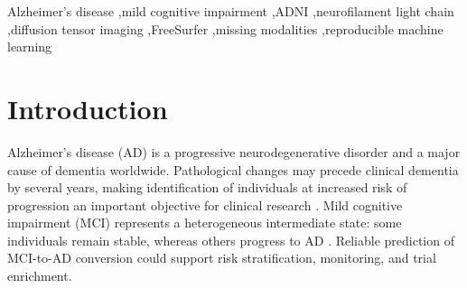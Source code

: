 \documentclass[preprint,12pt]{elsarticle}
\begin{document}
\begin{frontmatter}
\begin{abstract}
\textbf{Results:}
Clinical variables were nearly complete, whereas NfL and primary DTI features were available for 336 (47.9\%) and 127 (18.1\%) participants, respectively. In prespecified logistic-regression ablations, clinical core features achieved an AUC of 0.580 (95\% CI 0.486--0.674), clinical extended features plus NfL achieved 0.678 (0.590--0.762), and clinical extended features plus DTI achieved 0.636 (0.547--0.727). Exploratory structural MRI analysis achieved an AUC of 0.780 (0.703--0.848), while the exploratory all-modality configuration achieved 0.802 (0.730--0.872). Complete-case DTI evaluation was infeasible because the test subset contained only four converters.

\textbf{Conclusions:}
NfL provided a modest improvement over clinical characteristics, while sparse DTI availability limited reliable complete-case evaluation. Structural MRI findings were stronger but remain exploratory and require independent validation. Explicit cohort rules, temporal matching, training-only preprocessing, and uncertainty reporting were essential for distinguishing reproducible findings from results driven by limited or informative modality availability.

\end{abstract}

\begin{keyword}
Alzheimer's disease \sep mild cognitive impairment \sep ADNI \sep neurofilament light chain \sep diffusion tensor imaging \sep FreeSurfer \sep missing modalities \sep reproducible machine learning
\end{keyword}

\end{frontmatter}

\linenumbers

\section{Introduction}

Alzheimer's disease (AD) is a progressive neurodegenerative disorder and a major cause of dementia worldwide. Pathological changes may precede clinical dementia by several years, making identification of individuals at increased risk of progression an important objective for clinical research \cite{jackNIAAAResearchFramework2018,michaelw.weinerAlzheimersDiseaseNeuroimaging2017}. Mild cognitive impairment (MCI) represents a heterogeneous intermediate state: some individuals remain stable, whereas others progress to AD \cite{albertDiagnosisMildCognitive2011,petersenPracticeGuidelineUpdate2018,christosdavatzikosPredictionMCIAD2011,shannonl.risacherBaselineMRIPredictors2009}. Reliable prediction of MCI-to-AD conversion could support risk stratification, monitoring, and trial enrichment.
\end{document}
